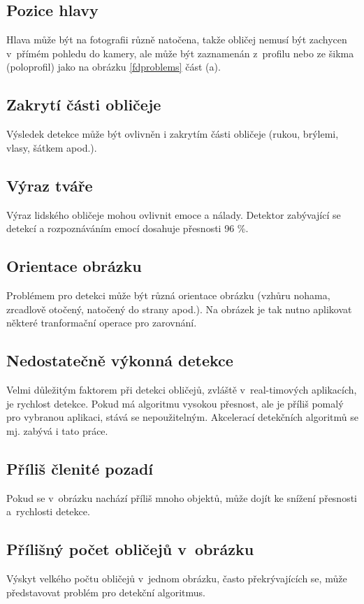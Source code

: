 \subsection*{Pozice hlavy}
Hlava může být na fotografii různě natočena, takže obličej nemusí být zachycen v~přímém pohledu do kamery, ale může být zaznamenán z~profilu nebo ze šikma (poloprofil) jako na obrázku \ref{fdproblems} část (a).

\subsection*{Zakrytí části obličeje}
Výsledek detekce může být ovlivněn i zakrytím části obličeje (rukou, brýlemi, vlasy, šátkem apod.).

\subsection*{Výraz tváře}
Výraz lidského obličeje mohou ovlivnit emoce a nálady. Detektor \cite{emotionDetector} zabývající se detekcí a rozpoznáváním emocí dosahuje přesnosti 96 \%.

\subsection*{Orientace obrázku}
Problémem pro detekci může být různá orientace obrázku (vzhůru nohama, zrcadlově otočený, natočený do strany apod.). Na obrázek je tak nutno aplikovat některé tranformační operace pro zarovnání.


\subsection*{Nedostatečně výkonná detekce}
Velmi důležitým faktorem při detekci obličejů, zvláště v~real-timových aplikacích, je rychlost detekce. Pokud má algoritmu vysokou přesnost, ale je příliš pomalý pro vybranou aplikaci, stává se nepoužitelným. Akcelerací detekčních algoritmů se mj. zabývá i tato práce.

\subsection*{Příliš členité pozadí} 
Pokud se v~obrázku nachází příliš mnoho objektů, může dojít ke snížení přesnosti a~rychlosti detekce.

\subsection*{Přílišný počet obličejů v~obrázku}
Výskyt velkého počtu obličejů v~jednom obrázku, často překrývajících se, může představovat problém pro detekční algoritmus. 

